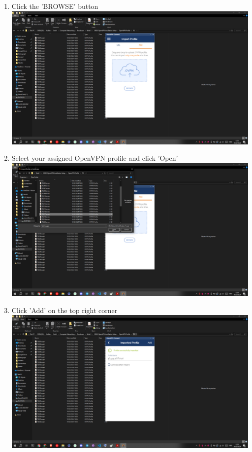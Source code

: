 \documentclass[12pt,titlepage]{article}
\begin{document}
\begin{enumerate}
    \item Click the 'BROWSE' button \\ \includegraphics[width=.9\textwidth]{images/figures/Screenshot (452).png}
    \newpage
    \item Select your assigned OpenVPN profile and click 'Open' \\ \includegraphics[width=.9\textwidth]{images/figures/Screenshot (453).png}
    \item Click 'Add' on the top right corner \\ \includegraphics[width=.9\textwidth]{images/figures/Screenshot (454).png}
    \newpage

\end{enumerate}
\end{document}
